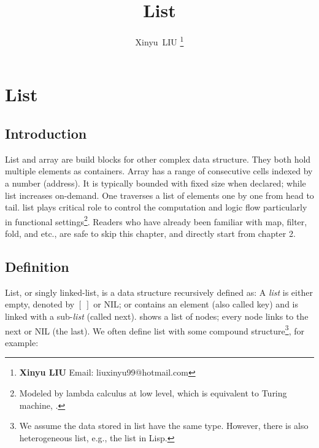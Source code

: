 \documentclass[b5paper]{article}
\begin{document}
\title{List}

\author{Xinyu~LIU
\thanks{{\bfseries Xinyu LIU} \newline
  Email: liuxinyu99@hotmail.com \newline}
  }

\maketitle
\fi


\ifx\wholebook\relax
\chapter{List}
\fi

\section{Introduction}
\label{introduction}

List and array are build blocks for other complex data structure. They both hold multiple elements as containers. Array has a range of consecutive cells indexed by a number (address). It is typically bounded with fixed size when declared; while list increases on-demand. One traverses a list of elements one by one from head to tail. list plays critical role to control the computation and logic flow particularly in functional settings\footnote{Modeled by lambda calculus at low level, which is equivalent to Turing machine\cite{mittype}, \cite{unplugged}.}. Readers who have already been familiar with map, filter, fold, and etc., are safe to skip this chapter, and directly start from chapter 2.

\section{Definition}

List, or singly linked-list, is a data structure recursively defined as: A {\em list} is either empty, denoted by $[\ ]$ or NIL; or contains an element (also called key) and is linked with a sub-{\em list} (called next).  shows a list of nodes; every node links to the next or NIL (the last). We often define list with some compound structure\footnote{We assume the data stored in list have the same type. However, there is also heterogeneous list, e.g., the list in Lisp.}, for example:
\end{document}
